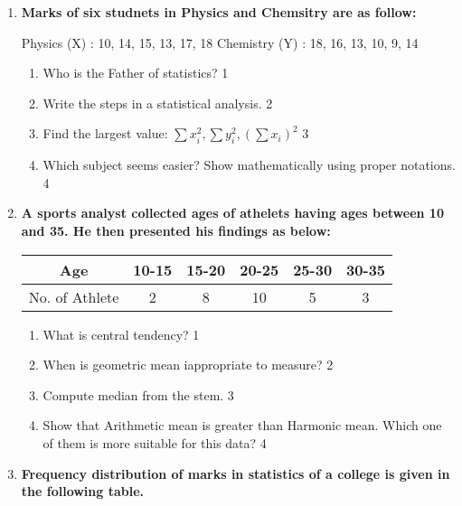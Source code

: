 \documentclass{article}
\begin{document}
  \begin{enumerate}
 \item 
	  \textbf{Marks of six studnets in Physics and Chemsitry are as follow:} 
	  
	  Physics (X)   : 10, 14, 15, 13, 17, 18
	  Chemistry (Y) : 18, 16, 13, 10, 9, 14
  
  \begin{enumerate}
    \item
	Who is the Father of statistics? \hfill 1
    \item
	Write the steps in a statistical analysis. \hfill 2
    \item  
	Find the largest value: $\displaystyle \sum x_i^2, \sum y_i^2, (\sum x_i)^2$ \hfill 3
    \item
	Which subject seems easier? Show mathematically using proper notations. \hfill 4
  \end{enumerate}
  
   \item
	  \textbf{A sports analyst collected ages of athelets having ages between 10 and 35. He then presented his findings as below:} 
	  
	  \begin{table}[h]
	    \centering
\begin{tabular}{c|c|c|c|c|c}
Age            & 10-15 & 15-20 & 20-25 & 25-30 & 30-35 \\ \hline
No. of Athlete & 2     & 8     & 10    & 5     & 3    
\end{tabular}
\end{table}
  
  \begin{enumerate}
    \item
	What is central tendency? \hfill 1
    \item
	When is geometric mean iappropriate to measure? \hfill 2
    \item  
	Compute median from the stem. \hfill 3
    \item
	Show that Arithmetic mean is greater than Harmonic mean. Which one of them is more suitable for this data? \hfill 4
  \end{enumerate}
  
   \item
  \textbf{Frequency distribution of marks in statistics of a college is given in the following table.}
 


\end{enumerate}
\end{document}
